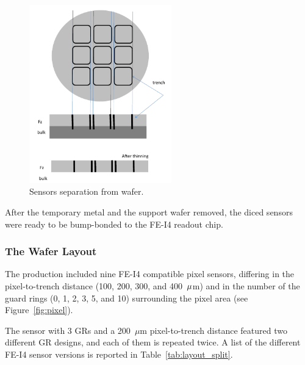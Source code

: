 \begin{figure}[!htpb]
\centering
\includegraphics[width=0.55\textwidth]{edgelesslapping.pdf}
\caption{Sensors separation from wafer.}
\label{fig:lapping}
\end{figure}


After the temporary metal and the support wafer removed, the diced sensors were ready to be 
bump-bonded to the FE-I4 readout chip.


\subsubsection{The Wafer Layout}
The production included nine FE-I4 compatible pixel sensors, differing in the pixel-to-trench distance (100, 200, 300, and 400~${\rm \mu}$m) and in the number of the guard rings (0, 1, 2, 3, 5, and 10)
surrounding the pixel area (see Figure~\ref{fig:pixel}).

The sensor with 3 GRs and a 200~$\mu$m pixel-to-trench distance featured two different GR designs, and
each of them is repeated twice.
A list of the different FE-I4 sensor versions is reported in Table~\ref{tab:layout_split}.


